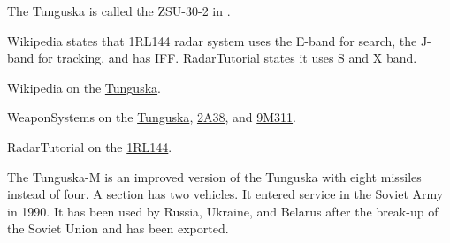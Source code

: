 \begin{withcounters}
{        The Tunguska is called the ZSU-30-2 in {\AirStr}.


        Wikipedia states that 1RL144 radar system uses the E-band for search, the J-band for tracking, and has IFF. RadarTutorial states it uses S and X band.

        \begin{notesources}
            \item Wikipedia on the \href{https://en.wikipedia.org/wiki/2K22_Tunguska}{Tunguska}.
            \item WeaponSystems on the \href{https://weaponsystems.net/system/60-2S6\%20Tunguska}{Tunguska}, \href{https://weaponsystems.net/system/558-30mm+2A38}{2A38}, and \href{https://weaponsystems.net/system/1433-9M311}{9M311}.
            \item RadarTutorial on the \href{https://www.radartutorial.eu/19.kartei/04.battle/karte057.en.html}{1RL144}.
        \end{notesources}
    }


    The Tunguska-M is an improved version of the Tunguska with eight missiles instead of four. A section has two vehicles. It entered service in the Soviet Army in 1990. It has been used by Russia, Ukraine, and Belarus after the break-up of the Soviet Union and has been exported.%


\end{withcounters}
